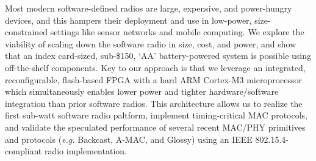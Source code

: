 
Most modern software-defined radios are large, expensive, and
power-hungry devices, and this hampers their deployment and use in
low-power, size-constrained settings like sensor networks and mobile
computing.  We explore the viability of scaling down the software
radio in size, cost, and power, and show that an index card-sized,
sub-\$150, `AA' battery-powered system is possible using off-the-shelf
components.  Key to our approach is that we leverage an integrated,
reconfigurable, flash-based FPGA with a hard ARM Cortex-M3
microprocessor which simultaneously enables lower power and tighter
hardware/soft\-ware integration than prior software radios.  This
architecture allows us to realize the first sub-watt software radio 
paltform, implement timing-critical MAC protocols, and
validate the speculated performance of several recent MAC/PHY
primitives and protocols (\textit{e.g.} Backcast, A-MAC, and Glossy) using
an IEEE 802.15.4-compliant radio implementation.
\begin{comment}
The work also identifies several improvements
in the underlying hardware components that could improve power,
performance, and flexibility.
\end{comment}
